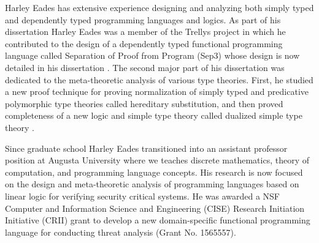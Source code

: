 Harley Eades has extensive experience designing and analyzing both
simply typed and dependently typed programming languages and
logics. As part of his dissertation Harley Eades was a member of the
Trellys project \cite{Kimmel:2013,Sjoberg:2012} in which he
contributed to the design of a dependently typed functional
programming language called Separation of Proof from Program (Sep3)
whose design is now detailed in his dissertation
\cite{Eades:2014b,Kimmel:2013}. The second major part of his
dissertation was dedicated to the meta-theoretic analysis of various
type theories. First, he studied a new proof technique for proving
normalization of simply typed and predicative polymorphic type
theories called hereditary substitution, and then proved completeness
of a new logic and simple type theory called dualized simple type
theory \cite{Eades:2014b}.

Since graduate school Harley Eades transitioned into an assistant
professor position at Augusta University where we teaches discrete
mathematics, theory of computation, and programming language
concepts. His research is now focused on the design and meta-theoretic
analysis of programming languages based on linear logic for verifying
security critical systems.  He was awarded a NSF Computer and
Information Science and Engineering (CISE) Research Initiation
Initiative (CRII) grant to develop a new domain-specific functional
programming language for conducting threat analysis (Grant
No. 1565557).
